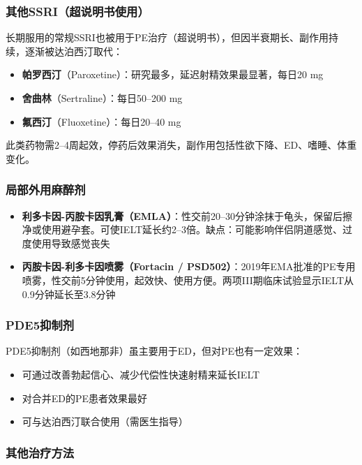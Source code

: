 \subsubsection{其他SSRI（超说明书使用）}

长期服用的常规SSRI也被用于PE治疗（超说明书），但因半衰期长、副作用持续，逐渐被达泊西汀取代：
\begin{itemize}[leftmargin=2cm]
	\item \textbf{帕罗西汀}（Paroxetine）：研究最多，延迟射精效果最显著，每日20 mg
	\item \textbf{舍曲林}（Sertraline）：每日50--200 mg
	\item \textbf{氟西汀}（Fluoxetine）：每日20--40 mg
\end{itemize}
此类药物需2--4周起效，停药后效果消失，副作用包括性欲下降、ED、嗜睡、体重变化。

\subsubsection{局部外用麻醉剂}

\begin{itemize}[leftmargin=2cm]
	\item \textbf{利多卡因-丙胺卡因乳膏（EMLA）}：性交前20--30分钟涂抹于龟头，保留后擦净或使用避孕套。可使IELT延长约2--3倍。缺点：可能影响伴侣阴道感觉、过度使用导致感觉丧失
	\item \textbf{丙胺卡因-利多卡因喷雾（Fortacin / PSD502）}：2019年EMA批准的PE专用喷雾，性交前5分钟使用，起效快、使用方便。两项III期临床试验显示IELT从0.9分钟延长至3.8分钟
\end{itemize}

\subsubsection{PDE5抑制剂}

PDE5抑制剂（如西地那非）虽主要用于ED，但对PE也有一定效果：
\begin{itemize}[leftmargin=2cm]
	\item 可通过改善勃起信心、减少代偿性快速射精来延长IELT
	\item 对合并ED的PE患者效果最好
	\item 可与达泊西汀联合使用（需医生指导）
\end{itemize}

\subsubsection{其他治疗方法}

